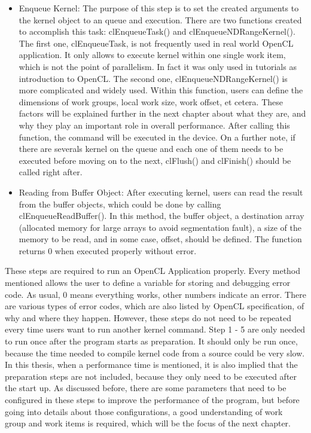 \begin{itemize}
	\item Enqueue Kernel: The purpose of this step is to set the created arguments to the kernel object to an queue and execution.  There are two functions created to accomplish this task: clEnqueueTask() and clEnqueueNDRangeKernel(). The first one, clEnqueueTask, is not frequently used in real world OpenCL application. It only allows to execute kernel within one single work item, which is not the point of parallelism. In fact it was only used in tutorials as introduction to OpenCL. The second one, clEnqueueNDRangeKernel() is more complicated and widely used. Within this function, users can define the dimensions of work groups, local work size, work offset, et cetera. These factors will be explained further in the next chapter about what they are, and why they play an important role in overall performance. After calling this function, the command will be executed in the device. On a further note, if there are severals kernel on the queue and each one of them needs to be executed before moving on to the next, clFlush() and clFinish() should be called right after.
	\item Reading from Buffer Object: After executing kernel, users can read the result from the buffer objects, which could be done by calling clEnqueueReadBuffer(). In this method, the buffer object, a destination array (allocated memory for large arrays to avoid segmentation fault), a size of the memory to be read, and in some case, offset, should be defined. The function returns 0 when executed properly without error.
\end{itemize}

These steps are required to run an OpenCL Application properly. Every method mentioned allows the user to define a variable for storing and debugging error code. As usual, 0 means everything works, other numbers indicate an error. There are various types of error codes, which are also listed by OpenCL specification, of why and where they happen. However, these steps do not need to be repeated every time users want to run another kernel command. Step 1 - 5 are only needed to run once after the program starts as preparation. It should only be run once, because the time needed to compile kernel code from a source could be very slow. In this thesis, when a performance time is mentioned, it is also implied that the preparation steps are not included, because they only need to be executed after the start up. As discussed before, there are some parameters that need to be configured in these steps to improve the performance of the program, but before going into details about those configurations, a good understanding of work group and work items is required, which will be the focus of the next chapter. 

